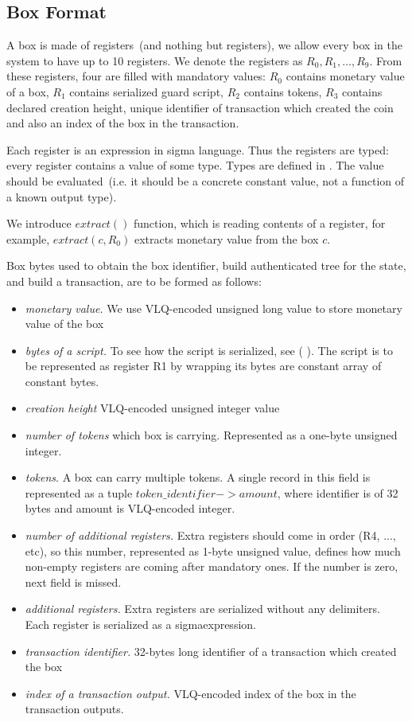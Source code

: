 \documentclass[]{article}   %
\newcommand{\authnote}[2]{\marginpar{\parbox{\marginparwidth}{\tiny %
  \textsf{#1 {\textcolor{blue}{notes: #2}}}}}%
  \textcolor{blue}{\textbf{\dag}}}
\newcommand{\authnote}[2]{
  \textsf{#1 \textcolor{blue}{: #2}}}
\newcommand{\authnote}[2]{}
\newcommand{\knote}[1]{{\authnote{\textcolor{green}{Alex notes}}{#1}}}
\newcommand{\coin}{box}
\newcommand{\Coin}{Box}
\newcommand{\sigm}{sigma}
\newcommand{\extract}[1]{$extract({#1})$}
\begin{document}
\subsection{\Coin{} Format}
\label{box-format}

A \coin{} is made of registers~(and nothing but registers), we allow every \coin{} in the system to have up to 10 registers.
We denote the registers as $R_0,R_1,\ldots,R_9$.
From these registers, four are filled with mandatory values: $R_0$ contains monetary value of a \coin{}, $R_1$ contains
serialized guard script, $R_2$ contains tokens, $R_3$ contains declared creation height, unique identifier of transaction which created the
coin and also an index of the \coin{} in the transaction.

Each register is an expression in \sigm{} language. Thus the registers are typed: every register contains a value of
some type. Types are defined in \knote{ref}. The value should be evaluated~(i.e. it should be a concrete constant value,
not a function of a known output type).

We introduce \extract{} function, which is reading contents of a register, for example, \extract{c, R_0} extracts monetary value
from the \coin{} $c$.

\Coin{} bytes used to obtain the \coin{} identifier, build authenticated tree for the state, and build a transaction,
are to be formed as follows:

\begin{itemize}
    \item{\em monetary value. } We use VLQ-encoded unsigned long value to store monetary value of the \coin{}
    \item{\em bytes of a script. } To see how the script is serialized, see (\knote{link to \sigm language expressions
    serialization}). The script is to be represented as register R1 by wrapping its bytes are constant array of constant
    bytes.
    \item{\em creation height } VLQ-encoded unsigned integer value
    \item{\em number of tokens } which box is carrying. Represented as a one-byte unsigned integer.
    \item{\em tokens}. A box can carry multiple tokens. A single record in this field is represented as a tuple
    $token\_identifier -> amount$, where identifier is of 32 bytes and amount is VLQ-encoded integer.
    \item{\em number of additional registers. } Extra registers should come in order (R4, ..., etc), so this number,
    represented as 1-byte unsigned value, defines how much non-empty registers are coming after mandatory ones. If the number is
    zero, next field is missed.
    \item{\em additional registers. } Extra registers are serialized without any delimiters. Each register is
    serialized as a \sigm expression.
    \item{\em transaction identifier. } 32-bytes long identifier of a transaction which created the \coin{}
    \item{\em index of a transaction output. } VLQ-encoded index of the \coin{} in the transaction outputs.
\end{itemize}
\end{document}
